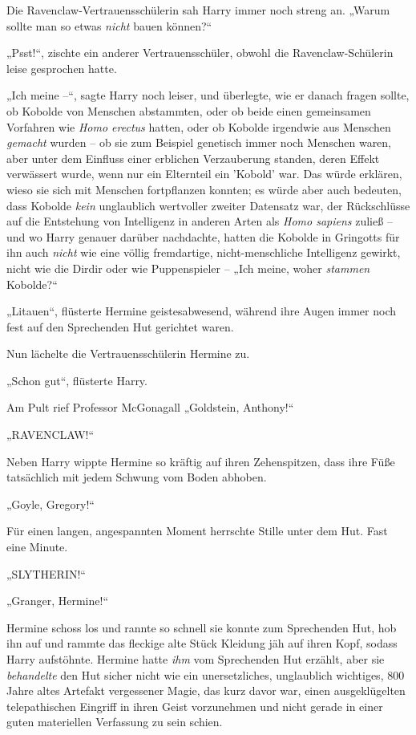 {Die Ravenclaw-Vertrauensschülerin sah Harry immer noch streng an. „Warum sollte man so etwas \emph{nicht} bauen können?“

„Psst!“, zischte ein anderer Vertrauensschüler, obwohl die Ravenclaw-Schülerin leise gesprochen hatte.

„Ich meine --“, sagte Harry noch leiser, und überlegte, wie er danach fragen sollte, ob Kobolde von Menschen abstammten, oder ob beide einen gemeinsamen Vorfahren wie \emph{Homo erectus} hatten, oder ob Kobolde irgendwie aus Menschen \emph{gemacht} wurden -- ob sie zum Beispiel genetisch immer noch Menschen waren, aber unter dem Einfluss einer erblichen Verzauberung standen, deren Effekt verwässert wurde, wenn nur ein Elternteil ein 'Kobold' war. Das würde erklären, wieso sie sich mit Menschen fortpflanzen konnten; es würde aber auch bedeuten, dass Kobolde \emph{kein} unglaublich wertvoller zweiter Datensatz war, der Rückschlüsse auf die Entstehung von Intelligenz in anderen Arten als \emph{Homo sapiens} zuließ -- und wo Harry genauer darüber nachdachte, hatten die Kobolde in Gringotts für ihn auch \emph{nicht} wie eine völlig fremdartige, nicht-menschliche Intelligenz gewirkt, nicht wie die Dirdir oder wie Puppenspieler -- „Ich meine, woher \emph{stammen} Kobolde?“

„Litauen“, flüsterte Hermine geistesabwesend, während ihre Augen immer noch fest auf den Sprechenden Hut gerichtet waren.

Nun lächelte die Vertrauensschülerin Hermine zu.

„Schon gut“, flüsterte Harry.

Am Pult rief Professor McGonagall „Goldstein, Anthony!“

„RAVENCLAW!“

Neben Harry wippte Hermine so kräftig auf ihren Zehenspitzen, dass ihre Füße tatsächlich mit jedem Schwung vom Boden abhoben.

„Goyle, Gregory!“

Für einen langen, angespannten Moment herrschte Stille unter dem Hut. Fast eine Minute.

„SLYTHERIN!“

„Granger, Hermine!“

Hermine schoss los und rannte so schnell sie konnte zum Sprechenden Hut, hob ihn auf und rammte das fleckige alte Stück Kleidung jäh auf ihren Kopf, sodass Harry aufstöhnte. Hermine hatte \emph{ihm} vom Sprechenden Hut erzählt, aber sie \emph{behandelte} den Hut sicher nicht wie ein unersetzliches, unglaublich wichtiges, 800 Jahre altes Artefakt vergessener Magie, das kurz davor war, einen ausgeklügelten telepathischen Eingriff in ihren Geist vorzunehmen und nicht gerade in einer guten materiellen Verfassung zu sein schien.

}
